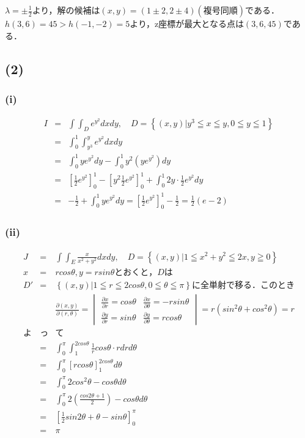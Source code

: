 \documentclass[11pt, titlepage]{jsarticle}
\begin{document}
$\lambda=\pm \frac{1}{2}$より，解の候補は$(x,y)=\left( 1\pm2,  2\pm4 \right) (複号同順)$である．$h(3,6) = 45 > h(-1, -2) = 5$より，z座標が最大となる点は$\left(3, 6, 45\right)$である．

\newpage
\subsection*{(2)}
\subsubsection*{(i)}
\begin{eqnarray*}
  I&=&\int\int_D e^{y^2} dxdy, \quad D=\left\{ (x,y) | y^3 \leqq x \leqq y, 0 \leqq y \leqq 1 \right\} \\
  &=&\int_0^1 \int_{y^3}^y e^{y^2}dxdy \\
  &=&\int_0^1 ye^{y^2}dy - \int_0^1 y^2\left(ye^{y^2}\right) dy \\
  &=&\left[ \frac{1}{2}e^{y^2} \right]_0^1 - \left[y^2\frac{1}{2}e^{y^2} \right]_0^1 + \int_0^1 2y\cdot\frac{1}{2}e^{y^2} dy \\
  &=&-\frac{1}{2} + \int_0^1 ye^{y^2}dy=\left[ \frac{1}{2}e^{y^2} \right]_0^1-\frac{1}{2}=\frac{1}{2} \left( e-2 \right)
\end{eqnarray*}

\subsubsection*{(ii)}
\begin{eqnarray*}
  J&=&\int\int_E \frac{x}{x^2+y^2} dxdy, \quad D=\left\{ (x,y) | 1 \leqq x^2+y^2 \leqq 2x, y \geqq 0 \right\} \\
  x&=&rcos\theta, y=rsin\theta とおくと，Dは\\
  D'&=&\left\{ (x,y) | 1 \leqq r \leqq 2cos\theta, 0 \leqq \theta \leqq \pi \right\}に全単射で移る．このとき\\
  &&\frac{\partial (x,y)}{\partial (r,\theta)}=\begin{vmatrix}
    \frac{\partial x}{\partial r}=cos\theta & \frac{\partial x}{\partial \theta}=-rsin\theta \\
    \frac{\partial y}{\partial r}=sin\theta & \frac{\partial y}{\partial \theta}=rcos\theta
  \end{vmatrix}=r(sin^2\theta + cos^2\theta)=r \\
  よ&っ&て\\
  &=&\int_0^\pi \int_1^{2cos\theta} \frac{1}{r}cos\theta \cdot r drd\theta \\
  &=&\int_0^\pi \left[ rcos\theta \right]_1^{2cos\theta} d\theta\\
  &=&\int_0^\pi 2cos^2\theta - cos\theta d\theta \\
  &=&\int_0^\pi 2\left( \frac{cos2\theta + 1}{2} \right) - cos\theta d\theta \\
  &=&\left[ \frac{1}{2}sin2\theta + \theta - sin\theta \right]_0^\pi \\
  &=&\pi
\end{eqnarray*}
\end{document}
